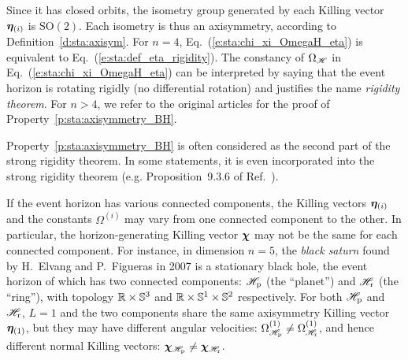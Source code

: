 Since it has closed orbits, the isometry group generated by each Killing vector
$\bm{\eta}_{(i)}$ is $\mathrm{SO}(2)$. Each isometry is thus an
axisymmetry,
according to Definition~\ref{d:sta:axisym}.
For $n=4$, Eq.~(\ref{e:sta:chi_xi_OmegaH_eta}) is
equivalent to Eq.~(\ref{e:sta:def_eta_rigidity}).
The constancy of $\Omega_{\mathscr{H}}$ in Eq.~(\ref{e:sta:chi_xi_OmegaH_eta})
can be interpreted by saying that the event horizon is rotating rigidly
(no differential rotation) and justifies the name \emph{rigidity theorem}.
For $n>4$, we refer
to the original articles \cite{HollaIW07,MoncrI08} for the proof
of Property~\ref{p:sta:axisymmetry_BH}.

\begin{remark}
Property~\ref{p:sta:axisymmetry_BH} is often considered as the second part
of the strong rigidity theorem. In some statements, it is even incorporated
into the strong rigidity theorem (e.g. Proposition~9.3.6 of Ref.~\cite{HawkiE73}).
\end{remark}

\begin{remark}
\label{r:sta:dep_eta_Omega}
If the event horizon has various connected components, the Killing vectors
$\bm{\eta}_{(i)}$ and the constants $\Omega^{(i)}$ may vary from one connected
component to the other. In particular, the horizon-generating Killing vector $\bm{\chi}$
may not be the same for each connected component. For instance,
in dimension $n=5$, the \emph{black saturn}
found by H.~Elvang and P.~Figueras in 2007 \cite{ElvanF07}
is a stationary black hole, the event horizon of which has two connected
components: $\mathscr{H}_{\rm p}$ (the ``planet'') and $\mathscr{H}_{\rm r}$ (the ``ring''),
with topology $\mathbb{R}\times\mathbb{S}^3$ and $\mathbb{R}\times\mathbb{S}^1\times\mathbb{S}^2$ respectively.
For both $\mathscr{H}_{\rm p}$ and $\mathscr{H}_{\rm r}$, $L=1$ and
the two components share the same axisymmetry Killing vector $\bm{\eta}_{(1)}$,
but they may have different angular velocities:
$\Omega^{(1)}_{\mathscr{H}_{\rm p}} \neq \Omega^{(1)}_{\mathscr{H}_{\rm r}}$, and hence
different normal Killing vectors: $\bm{\chi}_{\mathscr{H}_{\rm p}} \neq \bm{\chi}_{\mathscr{H}_{\rm r}}$.
\end{remark}

